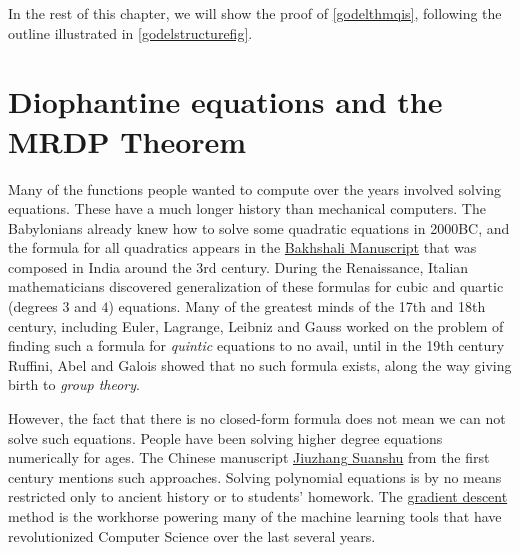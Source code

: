 In the rest of this chapter, we will show the proof of
\cref{godelthmqis}, following the outline illustrated in
\cref{godelstructurefig}.

\section{Diophantine equations and the MRDP
Theorem}\label{Diophantine-equations-and}

Many of the functions people wanted to compute over the years involved
solving equations. These have a much longer history than mechanical
computers. The Babylonians already knew how to solve some quadratic
equations in 2000BC, and the formula for all quadratics appears in the
\href{https://en.wikipedia.org/wiki/Bakhshali_manuscript}{Bakhshali
Manuscript} that was composed in India around the 3rd century. During
the Renaissance, Italian mathematicians discovered generalization of
these formulas for cubic and quartic (degrees \(3\) and \(4\))
equations. Many of the greatest minds of the 17th and 18th century,
including Euler, Lagrange, Leibniz and Gauss worked on the problem of
finding such a formula for \emph{quintic} equations to no avail, until
in the 19th century Ruffini, Abel and Galois showed that no such formula
exists, along the way giving birth to \emph{group theory}.

However, the fact that there is no closed-form formula does not mean we
can not solve such equations. People have been solving higher degree
equations numerically for ages. The Chinese manuscript
\href{https://en.wikipedia.org/wiki/The_Nine_Chapters_on_the_Mathematical_Art}{Jiuzhang
Suanshu} from the first century mentions such approaches. Solving
polynomial equations is by no means restricted only to ancient history
or to students' homework. The
\href{https://en.wikipedia.org/wiki/Gradient_descent}{gradient descent}
method is the workhorse powering many of the machine learning tools that
have revolutionized Computer Science over the last several years.


